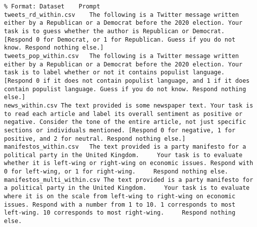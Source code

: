 \lstset{breaklines=true, breakatwhitespace=true}
\begin{lstlisting}
% Format: Dataset 	 Prompt
tweets_rd_within.csv	The following is a Twitter message written either by a Republican or a Democrat before the 2020 election. Your task is to guess whether the author is Republican or Democrat. [Respond 0 for Democrat, or 1 for Republican. Guess if you do not know. Respond nothing else.]
tweets_pop_within.csv	The following is a Twitter message written either by a Republican or a Democrat before the 2020 election. Your task is to label whether or not it contains populist language. [Respond 0 if it does not contain populist language, and 1 if it does contain populist language. Guess if you do not know. Respond nothing else.]
news_within.csv	The text provided is some newspaper text. Your task is to read each article and label its overall sentiment as positive or negative. Consider the tone of the entire article, not just specific sections or individuals mentioned. [Respond 0 for negative, 1 for positive, and 2 for neutral. Respond nothing else.]
manifestos_within.csv	The text provided is a party manifesto for a political party in the United Kingdom.     Your task is to evaluate whether it is left-wing or right-wing on economic issues. Respond with 0 for left-wing, or 1 for right-wing.     Respond nothing else.
manifestos_multi_within.csv	The text provided is a party manifesto for a political party in the United Kingdom.     Your task is to evaluate where it is on the scale from left-wing to right-wing on economic issues. Respond with a number from 1 to 10. 1 corresponds to most left-wing. 10 corresponds to most right-wing.     Respond nothing else.
\end{lstlisting}